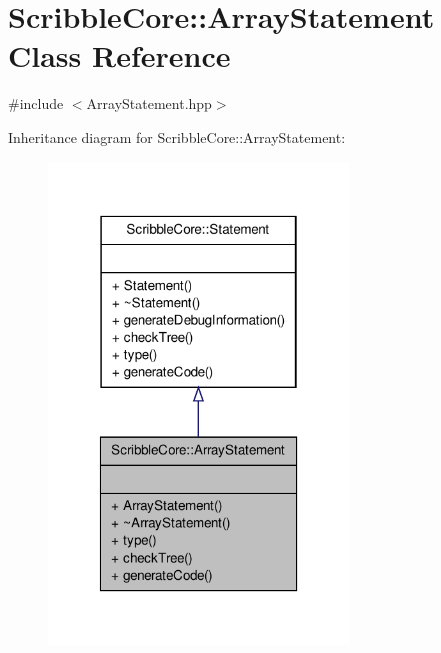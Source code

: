 \hypertarget{class_scribble_core_1_1_array_statement}{\section{Scribble\-Core\-:\-:Array\-Statement Class Reference}
\label{class_scribble_core_1_1_array_statement}
}


{\ttfamily \#include $<$Array\-Statement.\-hpp$>$}



Inheritance diagram for Scribble\-Core\-:\-:Array\-Statement\-:
\nopagebreak
\begin{figure}[H]
\begin{center}
\leavevmode
\includegraphics[width=226pt]{class_scribble_core_1_1_array_statement__inherit__graph}
\end{center}
\end{figure}


